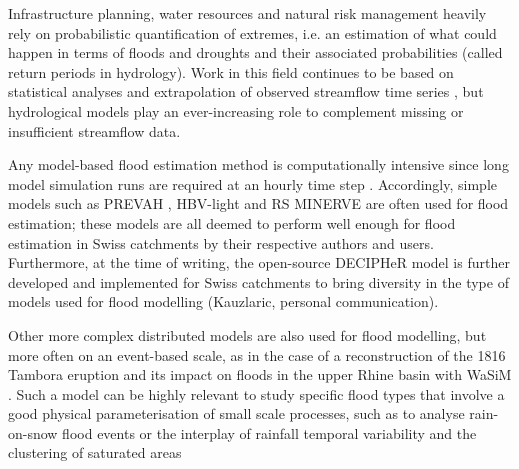 \documentclass[10pt,a4paper]{article}
\begin{document}
Infrastructure planning, water resources and natural risk management heavily rely on probabilistic quantification of extremes, i.e. an estimation of what could happen in terms of floods and droughts and their associated probabilities (called return periods in hydrology). Work in this field continues to be based on statistical analyses and extrapolation of observed streamflow time series \citep{Brunner2018, Asadi20108}, but hydrological models play an ever-increasing role to complement missing or insufficient streamflow data.

Any model-based flood estimation method is computationally intensive since long model simulation runs are required at an hourly time step \citep[see][about reducing computational requirements for extreme flood estimation by hydrological modelling]{SikorskaSenoner2020}. Accordingly, simple models such as PREVAH \citep{Viviroli2009, Viviroli2009c, Felder2017}, HBV-light \citep{Sikorska2017, Brunner2019a, SikorskaSenoner2020} and  RS MINERVE \citep{Bieri2013, Zeimetz2017, Zeimetz2018} are often used for flood estimation; these models are all deemed to perform well enough for flood estimation in Swiss catchments by their respective authors and users. Furthermore, at the time of writing, the open-source DECIPHeR model is further developed and implemented for Swiss catchments to bring diversity in the type of models used for flood modelling (Kauzlaric, personal communication).

Other more complex distributed models are also used for flood modelling, but more often on an event-based scale, as in the case of a reconstruction of the 1816 Tambora eruption and its impact on floods in the upper Rhine basin with WaSiM \citep[see Fig. \ref{fig:map};][]{Rossler2018}. Such a model can be highly relevant to study specific flood types that involve a good physical parameterisation of small scale processes, such as to analyse  rain-on-snow flood events \citep[][with WaSiM]{Rossler2014} or the interplay of rainfall temporal variability and the clustering of saturated areas \citep[][with TOPKAPI-ETH]{Paschalis2014}

\end{document}
